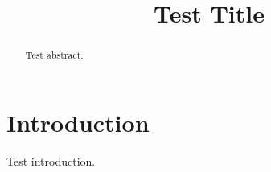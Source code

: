 \documentclass[conference]{IEEEtran}
\begin{document}
\title{Test Title}
\author{
}
\maketitle
\begin{abstract}
Test abstract.
\end{abstract}
\section{Introduction}
Test introduction.
\end{document}
